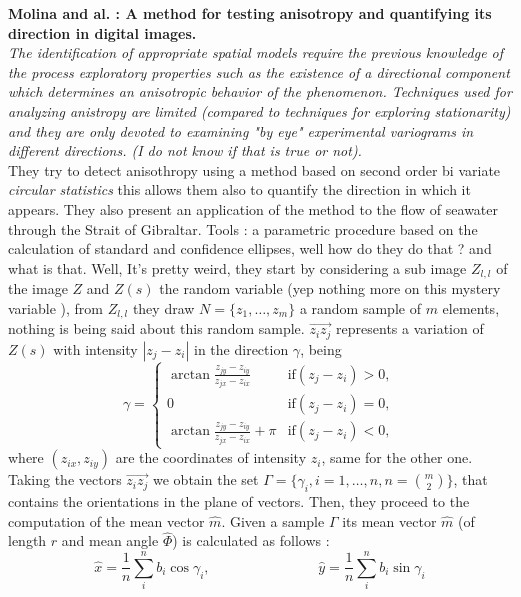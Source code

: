 \documentclass[12pt]{article}
\renewcommand{\hat}{\widehat}
\theoremstyle{Theorem}
\begin{document}
\textbf{Molina and al. : A method for testing anisotropy and quantifying its direction in digital images.}\\
 \textit{The identification of appropriate spatial models require the previous knowledge of the process exploratory properties such as the existence of a directional component which determines an anisotropic behavior of the phenomenon. Techniques used for analyzing anistropy are limited (compared to techniques for exploring stationarity) and they are only devoted to examining "by eye" experimental variograms in
different directions. (I do not know if that is true or not).} \\
They try to detect anisothropy using a method based on second order bi variate \textit{circular statistics} this allows them also to quantify the direction in which it appears. They also present an application of the method to  the flow of seawater through the Strait of Gibraltar. Tools : a parametric procedure based on the calculation of standard and confidence ellipses, well how do they do that ? and what is that. Well, It's pretty weird, they start by considering a sub image $Z_{l,l}$ of the image $Z$ and $Z(s)$ the random variable (yep nothing more on this mystery variable ), from $Z_{l,l}$ they draw $N=\{z_{1}, \ldots, z_{m}\}$ a random sample of $m$ elements, nothing is being said about this random sample. $\overrightarrow{z_{i}z_{j}}$ represents a variation of $Z(s)$ with intensity $|z_{j} - z_{i}|$ in the direction $\gamma$, being 
\begin{equation*}
\gamma = \begin{cases} \arctan{\frac{z_{jy} - z_{iy}}{z_{jx} - z_{ix}}}& \text{if} (z_{j} - z_{i}) > 0, \\
0 & \text{if} (z_{j} - z_{i}) = 0, \\
 \arctan{\frac{z_{jy} - z_{iy}}{z_{jx} - z_{ix}}} + \pi & \text{if} (z_{j} - z_{i})  < 0, 
\end{cases}
\end{equation*}
where $(z_{ix}, z_{iy})$ are the coordinates of intensity $z_i$, same for the other one. Taking the vectors $\overrightarrow{z_{i}z_{j}}$ we obtain the set $\Gamma = \{\gamma_{i}, i = 1, \ldots, n, n = \binom{m}{2}\}$, that contains the orientations in the plane of vectors. Then, they proceed to the computation of the mean vector $\hat{m}$. Given a sample $\Gamma$ its mean vector $\hat{m}$ (of length $r$ and mean angle $\hat{\Phi}$) is calculated as follows : 
\begin{equation*}
\hat{x} = \frac{1}{n} \sum_{i}^{n} b_{i}\cos{\gamma_{i}}, \; \hspace{3cm}  \; \hat{y} = \frac{1}{n}\sum_{i}^{n}b_{i}\sin{\gamma_{i}}
\end{equation*}
\end{document}
